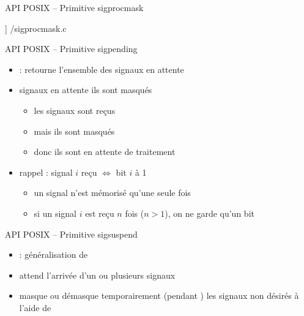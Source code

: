 \begin {frame} {API POSIX -- Primitive sigprocmask}

    \fD\lstmonstyle] {\inc/sigprocmask.c}

\end {frame}

\begin {frame} {API POSIX -- Primitive sigpending}
    \begin {itemize}
	\item {} : retourne l'ensemble des
	    signaux en attente

	\item signaux en attente \implique ils sont masqués
	    \begin {itemize}
		\item les signaux sont reçus
		\item mais ils sont masqués
		\item donc ils sont en attente de traitement
	    \end {itemize}

	\item rappel : signal $i$ reçu $\Leftrightarrow$ bit $i$ à 1
	    \begin {itemize}
		\item un signal n'est mémorisé qu'une seule fois
		\item si un signal $i$ est reçu $n$ fois ($n > 1$),
		    on ne garde qu'un bit
	    \end {itemize}
    \end {itemize}
\end {frame}

\begin {frame} {API POSIX -- Primitive sigsuspend}
    \begin {itemize}
	\item {} : généralisation de 
	\item attend l'arrivée d'un ou plusieurs signaux
	\item masque ou démasque temporairement (pendant
	    ) les signaux non désirés à l'aide de

    \end {itemize}
\end {frame}

